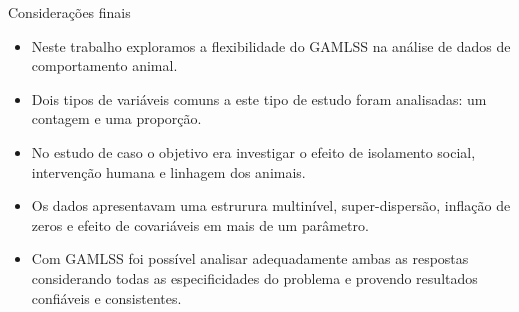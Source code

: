 \documentclass[
  ignorenonframetext,
  serif,
  professionalfont,
  usenames,
  dvipsnames,
  aspectratio = 169]{beamer}
\begin{document}
\begin{frame}{Considerações finais}
\protect\hypertarget{considerauxe7uxf5es-finais-1}{}
\begin{itemize}
\item
  Neste trabalho exploramos a flexibilidade do GAMLSS na análise de
  dados de comportamento animal.
\item
  Dois tipos de variáveis comuns a este tipo de estudo foram analisadas:
  um contagem e uma proporção.
\item
  No estudo de caso o objetivo era investigar o efeito de isolamento
  social, intervenção humana e linhagem dos animais.
\item
  Os dados apresentavam uma estrurura multinível, super-dispersão,
  inflação de zeros e efeito de covariáveis em mais de um parâmetro.
\item
  Com GAMLSS foi possível analisar adequadamente ambas as respostas
  considerando todas as especificidades do problema e provendo
  resultados confiáveis e consistentes.
\end{itemize}
\end{frame}
\end{document}
